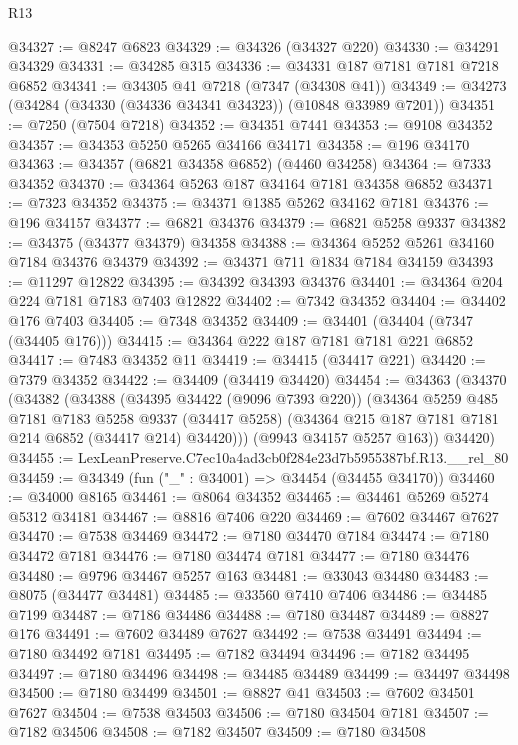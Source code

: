 \begin{lexlean}{R13}
\begin{coremodule}
@34327 := @8247 @6823
@34329 := @34326 (@34327 @220)
@34330 := @34291 @34329
@34331 := @34285 @315
@34336 := @34331 @187 @7181 @7181 @7218 @6852
@34341 := @34305 @41 @7218 (@7347 (@34308 @41))
@34349 := @34273 (@34284 (@34330 (@34336 @34341 @34323)) (@10848 @33989 @7201))
@34351 := @7250 (@7504 @7218)
@34352 := @34351 @7441
@34353 := @9108 @34352
@34357 := @34353 @5250 @5265 @34166 @34171
@34358 := @196 @34170
@34363 := @34357 (@6821 @34358 @6852) (@4460 @34258)
@34364 := @7333 @34352
@34370 := @34364 @5263 @187 @34164 @7181 @34358 @6852
@34371 := @7323 @34352
@34375 := @34371 @1385 @5262 @34162 @7181
@34376 := @196 @34157
@34377 := @6821 @34376
@34379 := @6821 @5258 @9337
@34382 := @34375 (@34377 @34379) @34358
@34388 := @34364 @5252 @5261 @34160 @7184 @34376 @34379
@34392 := @34371 @711 @1834 @7184 @34159
@34393 := @11297 @12822
@34395 := @34392 @34393 @34376
@34401 := @34364 @204 @224 @7181 @7183 @7403 @12822
@34402 := @7342 @34352
@34404 := @34402 @176 @7403
@34405 := @7348 @34352
@34409 := @34401 (@34404 (@7347 (@34405 @176)))
@34415 := @34364 @222 @187 @7181 @7181 @221 @6852
@34417 := @7483 @34352 @11
@34419 := @34415 (@34417 @221)
@34420 := @7379 @34352
@34422 := @34409 (@34419 @34420)
@34454 := @34363
    (@34370
      (@34382
        (@34388
          (@34395 @34422 (@9096 @7393 @220))
          (@34364
            @5259
            @485
            @7181
            @7183
            @5258
            @9337
            (@34417 @5258)
            (@34364 @215 @187 @7181 @7181 @214 @6852 (@34417 @214) @34420)))
        (@9943 @34157 @5257 @163))
      @34420)
@34455 := LexLeanPreserve.C7ec10a4ad3cb0f284e23d7b5955387bf.R13.__rel_80
@34459 := @34349 (fun ("_" : @34001) => @34454 (@34455 @34170))
@34460 := @34000 @8165
@34461 := @8064 @34352
@34465 := @34461 @5269 @5274 @5312 @34181
@34467 := @8816 @7406 @220
@34469 := @7602 @34467 @7627
@34470 := @7538 @34469
@34472 := @7180 @34470 @7184
@34474 := @7180 @34472 @7181
@34476 := @7180 @34474 @7181
@34477 := @7180 @34476
@34480 := @9796 @34467 @5257 @163
@34481 := @33043 @34480
@34483 := @8075 (@34477 @34481)
@34485 := @33560 @7410 @7406
@34486 := @34485 @7199
@34487 := @7186 @34486
@34488 := @7180 @34487
@34489 := @8827 @176
@34491 := @7602 @34489 @7627
@34492 := @7538 @34491
@34494 := @7180 @34492 @7181
@34495 := @7182 @34494
@34496 := @7182 @34495
@34497 := @7180 @34496
@34498 := @34485 @34489
@34499 := @34497 @34498
@34500 := @7180 @34499
@34501 := @8827 @41
@34503 := @7602 @34501 @7627
@34504 := @7538 @34503
@34506 := @7180 @34504 @7181
@34507 := @7182 @34506
@34508 := @7182 @34507
@34509 := @7180 @34508

\end{coremodule}
\end{lexlean}
